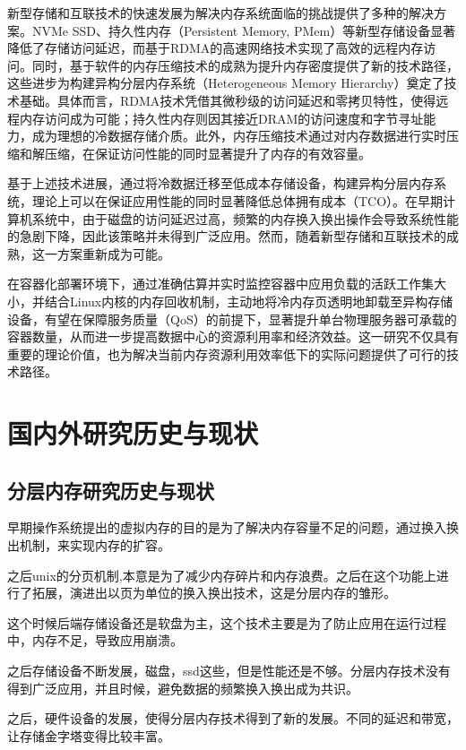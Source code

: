 新型存储和互联技术的快速发展为解决内存系统面临的挑战提供了多种的解决方案。NVMe SSD、持久性内存（Persistent Memory, PMem）等新型存储设备显著降低了存储访问延迟，而基于RDMA的高速网络技术实现了高效的远程内存访问。同时，基于软件的内存压缩技术的成熟为提升内存密度提供了新的技术路径，这些进步为构建异构分层内存系统（Heterogeneous Memory Hierarchy）奠定了技术基础。具体而言，RDMA技术凭借其微秒级的访问延迟和零拷贝特性，使得远程内存访问成为可能；持久性内存则因其接近DRAM的访问速度和字节寻址能力，成为理想的冷数据存储介质。此外，内存压缩技术通过对内存数据进行实时压缩和解压缩，在保证访问性能的同时显著提升了内存的有效容量。

基于上述技术进展，通过将冷数据迁移至低成本存储设备，构建异构分层内存系统，理论上可以在保证应用性能的同时显著降低总体拥有成本（TCO）。在早期计算机系统中，由于磁盘的访问延迟过高，频繁的内存换入换出操作会导致系统性能的急剧下降，因此该策略并未得到广泛应用。然而，随着新型存储和互联技术的成熟，这一方案重新成为可能。

在容器化部署环境下，通过准确估算并实时监控容器中应用负载的活跃工作集大小，并结合Linux内核的内存回收机制，主动地将冷内存页透明地卸载至异构存储设备，有望在保障服务质量（QoS）的前提下，显著提升单台物理服务器可承载的容器数量，从而进一步提高数据中心的资源利用率和经济效益。这一研究不仅具有重要的理论价值，也为解决当前内存资源利用效率低下的实际问题提供了可行的技术路径。

\section{国内外研究历史与现状}

\subsection{分层内存研究历史与现状}

早期操作系统提出的虚拟内存的目的是为了解决内存容量不足的问题，通过换入换出机制，来实现内存的扩容。

之后unix的分页机制,本意是为了减少内存碎片和内存浪费。之后在这个功能上进行了拓展，演进出以页为单位的换入换出技术，这是分层内存的雏形。

这个时候后端存储设备还是软盘为主，这个技术主要是为了防止应用在运行过程中，内存不足，导致应用崩溃。

之后存储设备不断发展，磁盘，ssd这些，但是性能还是不够。分层内存技术没有得到广泛应用，并且时候，避免数据的频繁换入换出成为共识。

之后，硬件设备的发展，使得分层内存技术得到了新的发展。不同的延迟和带宽，让存储金字塔变得比较丰富。

